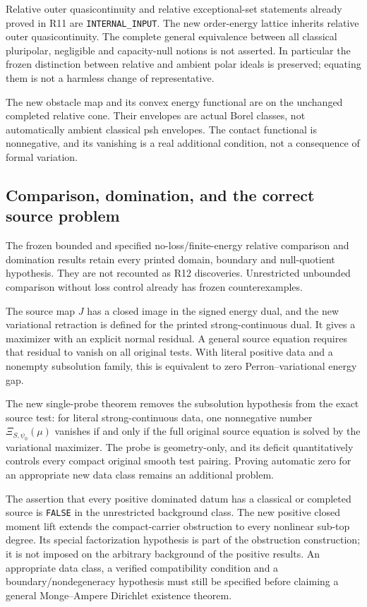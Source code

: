 \documentclass[11pt,a4paper]{article}
\numberwithin{equation}{section}
\theoremstyle{definition}
\theoremstyle{remark}
\begin{document}
Relative outer quasicontinuity and relative exceptional-set
statements already proved in R11 are \texttt{INTERNAL\_INPUT}.
The new order-energy lattice inherits relative outer
quasicontinuity. The complete general equivalence between all
classical pluripolar, negligible and capacity-null notions is
not asserted. In particular the frozen distinction between
relative and ambient polar ideals is preserved; equating them
is not a harmless change of representative.

The new obstacle map and its convex energy functional are on the
unchanged completed relative cone. Their envelopes are actual
Borel classes, not automatically ambient classical psh envelopes.
The contact functional is nonnegative, and its vanishing is a
real additional condition, not a consequence of formal variation.

\subsection{Comparison, domination, and the correct source problem}

The frozen bounded and specified no-loss/finite-energy relative
comparison and domination results retain every printed domain,
boundary and null-quotient hypothesis. They are not recounted as
R12 discoveries. Unrestricted unbounded comparison without loss
control already has frozen counterexamples.

The source map $J$ has a closed image in the signed energy dual,
and the new variational retraction is defined for the printed
strong-continuous dual. It gives a maximizer with an explicit
normal residual. A general source equation requires that residual
to vanish on all original tests. With literal positive data and
a nonempty subsolution family, this is equivalent to zero
Perron--variational energy gap.

The new single-probe theorem removes the subsolution hypothesis
from the exact source test: for literal strong-continuous data,
one nonnegative number $\Xi_{S,\psi_0}(\mu)$ vanishes if and
only if the full original source equation is solved by the
variational maximizer. The probe is geometry-only, and its
deficit quantitatively controls every compact original smooth
test pairing. Proving automatic zero for an appropriate new
data class remains an additional problem.

The assertion that every positive dominated datum has a classical
or completed source is \texttt{FALSE} in the unrestricted
background class. The new positive closed moment lift extends
the compact-carrier obstruction to every nonlinear sub-top
degree. Its special factorization hypothesis is part of the
obstruction construction; it is not imposed on the arbitrary
background of the positive results. An appropriate data class,
a verified compatibility condition and a boundary/nondegeneracy
hypothesis must still be specified before claiming a general
Monge--Ampere Dirichlet existence theorem.
\end{document}
